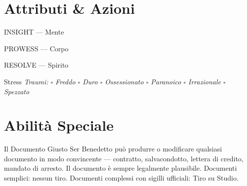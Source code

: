 \section*{Attributi \& Azioni}

\begin{attributoblock}[SpinolaRed]{INSIGHT — Mente}
\end{attributoblock}
\begin{attributoblock}[SpinolaRed]{PROWESS — Corpo}
\end{attributoblock}

\begin{attributoblock}[SpinolaRed]{RESOLVE — Spirito}


\end{attributoblock}

\medskip
\begin{pgclockbox}{Stress \hfill {}}
\small\textit{Traumi: $\square$ Freddo \quad $\square$ Duro \quad $\square$ Ossessionato \quad $\square$ Paranoico \quad $\square$ Irrazionale \quad $\square$ Spezzato}
\end{pgclockbox}

\section*{Abilità Speciale}
\begin{spinolabox}{Il Documento Giusto}
Ser Benedetto può produrre o modificare qualsiasi documento in modo convincente — contratto, salvacondotto, lettera di credito, mandato di arresto. Il documento è sempre legalmente plausibile. Documenti semplici: nessun tiro. Documenti complessi con sigilli ufficiali: Tiro su Studio.
\end{spinolabox}

